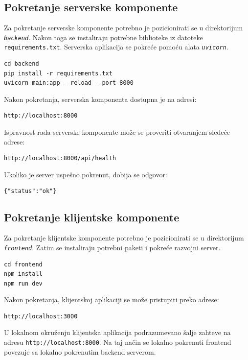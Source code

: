 \documentclass[12pt,oneside]{memoir}
\begin{document}
\subsection{Pokretanje serverske komponente}

Za pokretanje serverske komponente potrebno je pozicionirati se u direktorijum \texttt{\textit{backend}}. Nakon toga se instaliraju potrebne biblioteke iz datoteke \texttt{requirements.txt}. Serverska aplikacija se pokreće pomoću alata \texttt{\textit{uvicorn}}.

\begin{verbatim}
cd backend
pip install -r requirements.txt
uvicorn main:app --reload --port 8000
\end{verbatim}

Nakon pokretanja, serverska komponenta dostupna je na adresi:
\begin{verbatim}
http://localhost:8000
\end{verbatim}

Ispravnost rada serverske komponente može se proveriti otvaranjem sledeće adrese:
\begin{verbatim}
http://localhost:8000/api/health
\end{verbatim}

Ukoliko je server uspešno pokrenut, dobija se odgovor:
\begin{verbatim}
{"status":"ok"}
\end{verbatim}

\subsection{Pokretanje klijentske komponente}

Za pokretanje klijentske komponente potrebno je pozicionirati se u direktorijum \texttt{\textit{frontend}}. Zatim se instaliraju potrebni paketi i pokreće razvojni server.

\begin{verbatim}
cd frontend
npm install
npm run dev
\end{verbatim}

Nakon pokretanja, klijentskoj aplikaciji se može pristupiti preko adrese:
\begin{verbatim}
http://localhost:3000
\end{verbatim}

U lokalnom okruženju klijentska aplikacija podrazumevano šalje zahteve na adresu \texttt{http://localhost:8000}. Na taj način se lokalno pokrenuti frontend povezuje sa lokalno pokrenutim backend serverom.
\end{document}
